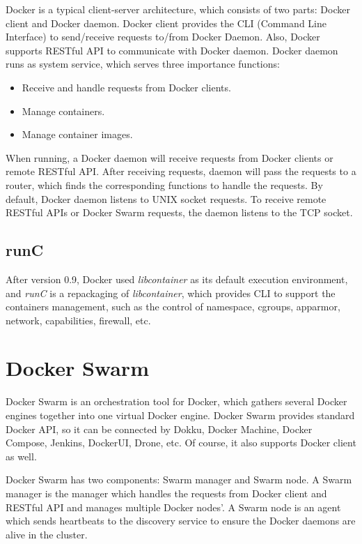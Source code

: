 Docker is a typical client-server architecture, which consists of two parts: Docker client and Docker daemon. Docker client provides the CLI (Command Line Interface) to send/receive requests to/from Docker Daemon.  Also, Docker supports RESTful API \cite{christensen2009using} to communicate with Docker daemon. Docker daemon runs as system service, which serves three  importance functions: 
\begin{itemize}
    \item Receive and handle requests from Docker clients.
    \item Manage containers.
    \item Manage container images.
\end{itemize}
When running, a Docker daemon will receive requests from Docker clients or remote RESTful API. After receiving requests, daemon will pass the requests to a router, which finds the corresponding functions to handle the requests. By default, Docker daemon listens to UNIX socket requests.  To receive remote RESTful APIs or Docker Swarm requests, the daemon listens to the TCP socket.

\subsection{runC}
After version 0.9, Docker used \emph{libcontainer} as its default execution environment, and \emph{runC} \cite{runc} is a repackaging of \emph{libcontainer}, which provides CLI to support the containers management, such as the control of namespace, cgroups, apparmor, network, capabilities, firewall, etc.

\section{Docker Swarm}
Docker Swarm is an orchestration tool for Docker, which gathers several Docker engines together into one virtual Docker engine. Docker Swarm provides standard Docker API, so it can be connected by Dokku, Docker Machine, Docker Compose, Jenkins, DockerUI, Drone, etc. Of course, it also supports Docker client as well.

Docker Swarm has two components: Swarm manager and Swarm node. A Swarm manager is the manager which handles the requests from Docker client and RESTful API and manages multiple Docker nodes'. A Swarm node is an agent which sends heartbeats to the discovery service to ensure the Docker daemons are alive in the cluster.

